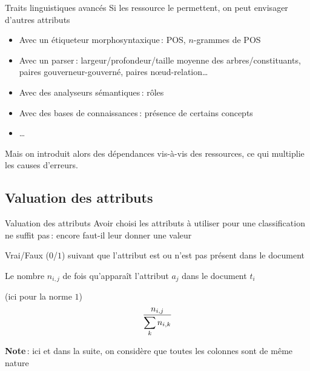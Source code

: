 \documentclass[hyperref={unicode}, xcolor={svgnames}, french]{beamer}
\begin{document}
\begin{frame}{Traits linguistiques avancés}
    Si les ressource le permettent, on peut envisager d'autres attributs
    \begin{itemize}
        \item Avec un étiqueteur morphosyntaxique : POS, $n$-grammes de POS
        \item Avec un parser : largeur/profondeur/taille moyenne des arbres/constituants, paires gouverneur-gouverné, paires nœud-relation…
        \item Avec des analyseurs sémantiques : rôles
        \item Avec des bases de connaissances : présence de certains concepts
        \item …
    \end{itemize}
    Mais on introduit alors des dépendances vis-à-vis des ressources, ce qui multiplie les causes d'erreurs.
\end{frame}


\subsection{Valuation des attributs}
\begin{frame}[label=attrval]{Valuation des attributs}
    Avoir choisi les attributs à utiliser pour une classification ne suffit pas : encore faut-il leur donner une valeur
    \begin{description}[*]
        \item[Booléenne] Vrai/Faux ($0$/$1$) suivant que l'attribut est ou n'est pas présent dans le document
        \item[Occurrences] Le nombre $n_{i,j}$ de fois qu'apparaît l'attribut $a_j$ dans le document $t_i$
        \item[Fréquences normalisées par ligne] (ici pour la norme $1$)
            \begin{equation}
                \frac{\mathnode{freqfracnum}{n_{i,j}}}{\mathnode{freqfracden}{\sum_k n_{i,k}}}
            \end{equation}
    \end{description}
    \textbf{Note} : ici et dans la suite, on considère que toutes les colonnes sont de même nature
\end{frame}
\end{document}
